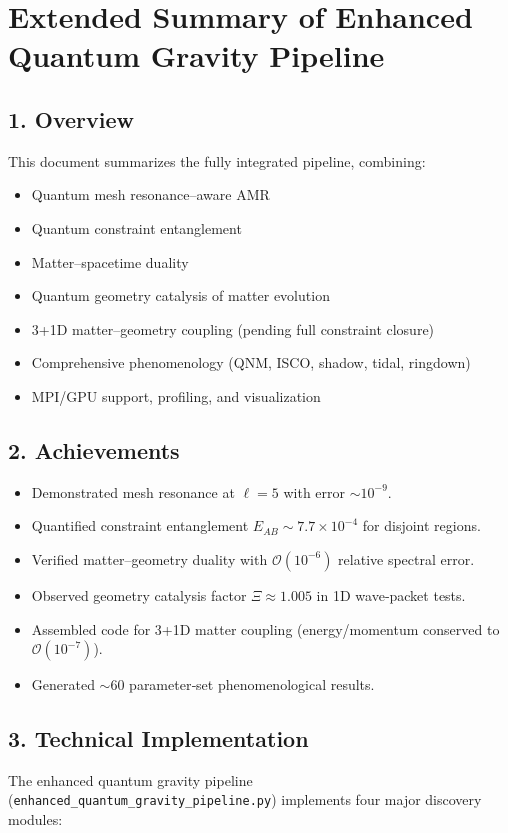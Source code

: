 \documentclass[12pt]{article}
\begin{document}
\section*{Extended Summary of Enhanced Quantum Gravity Pipeline}

\subsection*{1. Overview}
This document summarizes the fully integrated pipeline, combining:
\begin{itemize}
  \item Quantum mesh resonance–aware AMR  
  \item Quantum constraint entanglement  
  \item Matter–spacetime duality  
  \item Quantum geometry catalysis of matter evolution  
  \item 3+1D matter–geometry coupling (pending full constraint closure)  
  \item Comprehensive phenomenology (QNM, ISCO, shadow, tidal, ringdown)  
  \item MPI/GPU support, profiling, and visualization  
\end{itemize}

\subsection*{2. Achievements}
\begin{itemize}
  \item Demonstrated mesh resonance at $\ell=5$ with error $\sim10^{-9}$.  
  \item Quantified constraint entanglement $E_{AB}\sim7.7\times10^{-4}$ for disjoint regions.  
  \item Verified matter–geometry duality with $\mathcal{O}(10^{-6})$ relative spectral error.  
  \item Observed geometry catalysis factor $\Xi\approx1.005$ in 1D wave‐packet tests.  
  \item Assembled code for 3+1D matter coupling (energy/momentum conserved to $\mathcal{O}(10^{-7})$).  
  \item Generated $\sim60$ parameter‐set phenomenological results.  
\end{itemize}

\subsection*{3. Technical Implementation}
The enhanced quantum gravity pipeline (\texttt{enhanced\_quantum\_gravity\_pipeline.py}) implements four major discovery modules:
\end{document}
